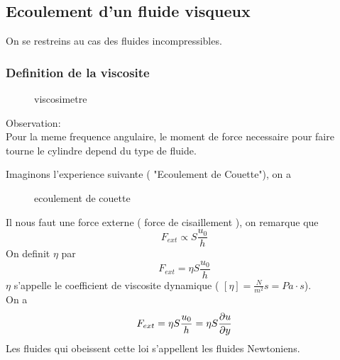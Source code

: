 \documentclass[../main.tex]{subfiles}
\begin{document}
\subsection{Ecoulement d'un fluide visqueux}
On se restreins au cas des fluides incompressibles.\\
\subsubsection{Definition de la viscosite}
\begin{exemple}
\begin{figure}[ht]
    \centering
    \caption{viscosimetre}
    \label{fig:viscosimetre}
\end{figure}
Observation:\\
Pour la meme frequence angulaire, le moment de force necessaire pour faire tourne le cylindre depend du type de fluide.

\end{exemple}
Imaginons l'experience suivante ( "Ecoulement de Couette"), on a

\begin{figure}[H]
    \centering
    \caption{ecoulement de couette}
    \label{fig:ecoulement-de-couette}
\end{figure}
Il nous faut une force externe ( force de cisaillement ), on remarque que
\[ 
	F_{ext} \propto  S \frac{u_0}{h}
\]
On definit $\eta$ par
\[ 
	F_{ext} = \eta S \frac{u_0}{h}
\]
$\eta$ s'appelle le coefficient de viscosite dynamique (  $[\eta] = \frac{N}{m^{2}}s= Pa \cdot s$).\\
On a
\[ 
	F_{ext} = \eta S \frac{u_0}{h} = \eta S \frac{\partial u}{\partial y}	
\]
Les fluides qui obeissent cette loi s'appellent les fluides Newtoniens.
\end{document}
